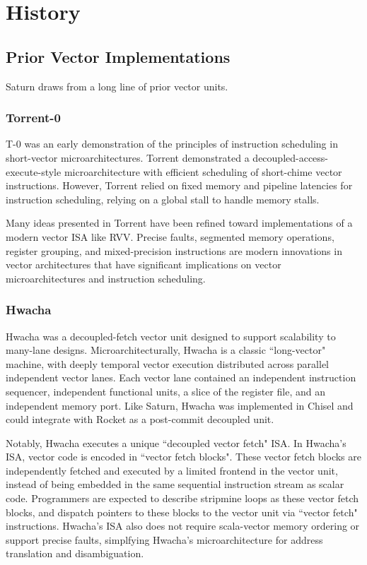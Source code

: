 \newpage
\section{History}
\label{sec:history}

\subsection{Prior Vector Implementations}

Saturn draws from a long line of prior vector units.

\subsubsection{Torrent-0}

T-0 \cite{t0} was an early demonstration of the principles of instruction scheduling in short-vector microarchitectures.
Torrent demonstrated a decoupled-access-execute-style microarchitecture with efficient scheduling of short-chime vector instructions.
However, Torrent relied on fixed memory and pipeline latencies for instruction scheduling, relying on a global stall to handle memory stalls.

Many ideas presented in Torrent have been refined toward implementations of a modern vector ISA like RVV.
Precise faults, segmented memory operations, register grouping, and mixed-precision instructions are modern innovations in vector architectures that have significant implications on vector microarchitectures and instruction scheduling.


\subsubsection{Hwacha}

Hwacha \cite{hwacha_manual} was a decoupled-fetch vector unit designed to support scalability to many-lane designs.
Microarchitecturally, Hwacha is a classic ``long-vector" machine, with deeply temporal vector execution distributed across parallel independent vector lanes.
Each vector lane contained an independent instruction sequencer, independent functional units, a slice of the register file, and an independent memory port.
Like Saturn, Hwacha was implemented in Chisel and could integrate with Rocket as a post-commit decoupled unit.

Notably, Hwacha executes a unique ``decoupled vector fetch" ISA.
In Hwacha's ISA, vector code is encoded in ``vector fetch blocks".
These vector fetch blocks are independently fetched and executed by a limited frontend in the vector unit, instead of being embedded in the same sequential instruction stream as scalar code.
Programmers are expected to describe stripmine loops as these vector fetch blocks, and dispatch pointers to these blocks to the vector unit via ``vector fetch" instructions.
Hwacha's ISA also does not require scala-vector memory ordering or support precise faults, simplfying Hwacha's microarchitecture for address translation and disambiguation.


